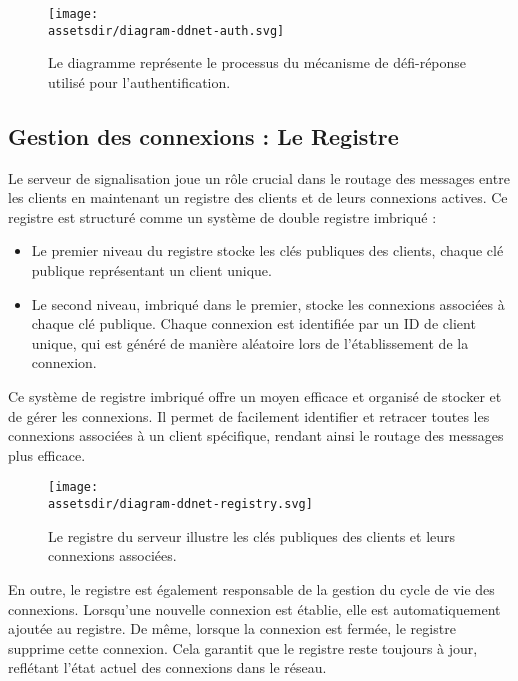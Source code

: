 \begin{figure}[H]
    \begin{center}
        \texttt{[image: \\assetsdir/diagram-ddnet-auth.svg]} %
    \end{center}
    \caption[Mécanisme de Défi-Réponse]{Le diagramme représente le processus du mécanisme de défi-réponse utilisé pour l'authentification.}
\end{figure}

\subsection{Gestion des connexions : Le Registre}

Le serveur de signalisation joue un rôle crucial dans le routage des messages entre les clients en maintenant un registre des clients et de leurs connexions actives. Ce registre est structuré comme un système de double registre imbriqué :

\begin{itemize}
    \item Le premier niveau du registre stocke les clés publiques des clients, chaque clé publique représentant un client unique.
    \item Le second niveau, imbriqué dans le premier, stocke les connexions associées à chaque clé publique. Chaque connexion est identifiée par un ID de client unique, qui est généré de manière aléatoire lors de l'établissement de la connexion.
\end{itemize}

Ce système de registre imbriqué offre un moyen efficace et organisé de stocker et de gérer les connexions. Il permet de facilement identifier et retracer toutes les connexions associées à un client spécifique, rendant ainsi le routage des messages plus efficace.

\begin{figure}[H]
    \begin{center}
        \texttt{[image: \\assetsdir/diagram-ddnet-registry.svg]}
    \end{center}
    \caption[Registre et Connexions]{Le registre du serveur illustre les clés publiques des clients et leurs connexions associées.}
\end{figure}

En outre, le registre est également responsable de la gestion du cycle de vie des connexions. Lorsqu'une nouvelle connexion est établie, elle est automatiquement ajoutée au registre. De même, lorsque la connexion est fermée, le registre supprime cette connexion. Cela garantit que le registre reste toujours à jour, reflétant l'état actuel des connexions dans le réseau.

